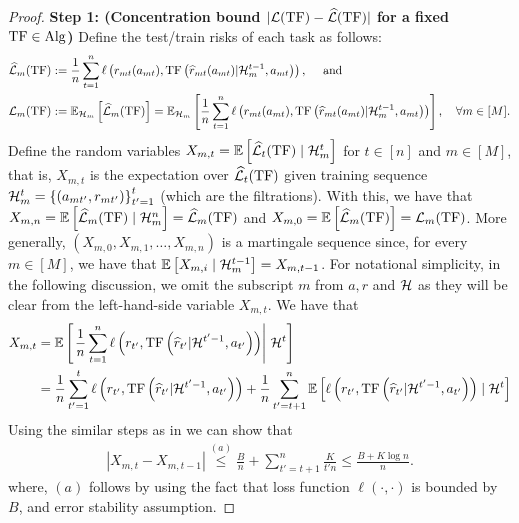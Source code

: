 \begin{proof}
\textbf{Step 1: (Concentration bound $|\mathcal{L}(\mathrm{TF})-\widehat{\mathcal{L}}(\mathrm{TF})|$ for a fixed $\mathrm{TF} \in \mathrm{Alg}$)} Define the test/train risks of each task as follows:
\begin{align*}
& \widehat{\mathcal{L}}_m(\mathrm{TF}):=\frac{1}{n} \sum_{t=1}^n \ell\left(r_{mt}(a_{mt}), \mathrm{TF}\left(\widehat{r}_{mt}(a_{mt})|\mathcal{H}_m^{t-1}, a_{m t}\right)\right), \quad \text { and } \\
& \mathcal{L}_m(\mathrm{TF}):=\mathbb{E}_{\mathcal{H}_m}\left[\widehat{\mathcal{L}}_m(\mathrm{TF})\right]=\mathbb{E}_{\mathcal{H}_m}\left[\frac{1}{n} \sum_{t=1}^n \ell\left(r_{mt}(a_{mt}), \mathrm{TF}\left(\widehat{r}_{mt}(a_{mt})|\mathcal{H}_m^{t-1}, a_{m t}\right)\right)\right], \quad \forall m \in[M] .
\end{align*}
Define the random variables $X_{m, t}=\mathbb{E}\left[\widehat{\mathcal{L}}_t(\mathrm{TF}) \mid \mathcal{H}_m^t\right]$ for $t \in[n]$ and $m \in[M]$, that is, $X_{m, t}$ is the expectation over $\widehat{\mathcal{L}}_t(\mathrm{TF})$ given training sequence $\mathcal{H}_m^t=\left\{\left(a_{m t'}, r_{m t'}\right)\right\}_{t'=1}^t$ (which are the filtrations). With this, we have that $X_{m, n}=\mathbb{E}\left[\widehat{\mathcal{L}}_m(\mathrm{TF}) \mid \mathcal{H}_m^n\right]=\widehat{\mathcal{L}}_m(\mathrm{TF})$ and $X_{m, 0}=\mathbb{E}\left[\widehat{\mathcal{L}}_m(\mathrm{TF})\right]=\mathcal{L}_m(\mathrm{TF})$. 
%
More generally, $\left(X_{m, 0}, X_{m, 1}, \ldots, X_{m, n}\right)$ is a martingale sequence since, for every $m \in [M]$, we have that $\mathbb{E}\left[X_{m, i} \mid \mathcal{H}_m^{t-1}\right]=X_{m, t-1}$.
For notational simplicity, in the following discussion, we omit the subscript $m$ from $a, r$ and $\mathcal{H}$ as they will be clear from the left-hand-side variable $X_{m, t}$. We have that
\begin{align*}
X_{m, t} & =\mathbb{E}\left[\left.\frac{1}{n} \sum_{t=1}^n \ell\left(r_{t'}, \operatorname{TF}\left(\widehat{r}_{t'}|\mathcal{H}^{t'-1}, a_{t'}\right)\right) \right\rvert\, \mathcal{H}^t\right] \\
& =\frac{1}{n} \sum_{t'=1}^t \ell\left(r_{t'}, \operatorname{TF}\left(\widehat{r}_{t'}|\mathcal{H}^{t'-1}, a_{t'}\right)\right)+\frac{1}{n} \sum_{t'=t+1}^n \mathbb{E}\left[\ell\left(r_{t'}, \operatorname{TF}\left(\widehat{r}_{t'}|\mathcal{H}^{t'-1}, a_{t'}\right)\right) \mid \mathcal{H}^t\right]
\end{align*}
Using the similar steps as in \citet{li2023transformers} we can show that
\begin{align*}
    \left|X_{m, t}-X_{m, t-1}\right| \overset{(a)}{\leq} \frac{B}{n}+\sum_{t'=t+1}^n \frac{K}{t' n} \leq \frac{B+K \log n}{n} .
\end{align*}
where, $(a)$ follows by using the fact that loss function $\ell(\cdot, \cdot)$ is bounded by $B$, and error stability assumption.


\end{proof}
